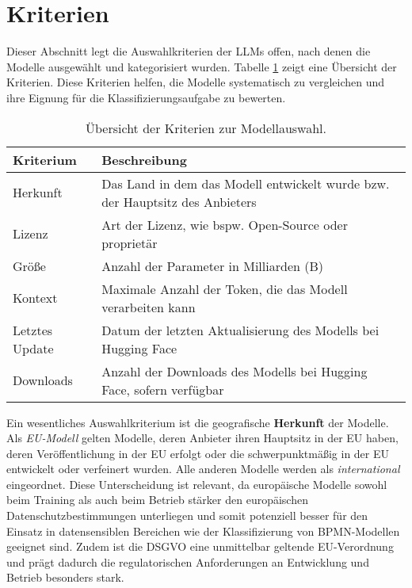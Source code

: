 \section{Kriterien}\label{sec:kriterien}

Dieser Abschnitt legt die Auswahlkriterien der \acp{LLM} offen, nach denen die Modelle ausgewählt und kategorisiert wurden. Tabelle \ref{tab:kriterien} zeigt eine Übersicht der Kriterien. Diese Kriterien helfen, die Modelle systematisch zu vergleichen und ihre Eignung für die Klassifizierungsaufgabe zu bewerten.

\begin{table}[htbp]
    \centering
    \caption{Übersicht der Kriterien zur Modellauswahl.}
    \label{tab:kriterien}
    \begin{tabularx}{\textwidth}{p{} p{}}
        \toprule
        \textbf{Kriterium} & \textbf{Beschreibung} \\
        \midrule
        Herkunft & Das Land in dem das Modell entwickelt wurde bzw. der Hauptsitz des Anbieters \\
        Lizenz & Art der Lizenz, wie bspw. Open-Source oder proprietär \\
        Größe & Anzahl der Parameter in Milliarden (B) \\
        Kontext & Maximale Anzahl der Token, die das Modell verarbeiten kann \\
        Letztes Update & Datum der letzten Aktualisierung des Modells bei Hugging Face \cite{huggingface} \\
        Downloads & Anzahl der Downloads des Modells bei Hugging Face, sofern verfügbar \\
        \bottomrule
    \end{tabularx}
\end{table}

Ein wesentliches Auswahlkriterium ist die geografische \textbf{Herkunft} der Modelle. Als \emph{\ac{EU}-Modell} gelten Modelle, deren Anbieter ihren Hauptsitz in der \ac{EU} haben, deren Veröffentlichung in der \ac{EU} erfolgt oder die schwerpunktmäßig in der \ac{EU} entwickelt oder verfeinert wurden. Alle anderen Modelle werden als \emph{international} eingeordnet. Diese Unterscheidung ist relevant, da europäische Modelle sowohl beim Training als auch beim Betrieb stärker den europäischen Datenschutzbestimmungen unterliegen und somit potenziell besser für den Einsatz in datensensiblen Bereichen wie der Klassifizierung von \ac{BPMN}-Modellen geeignet sind. Zudem ist die \ac{DSGVO} eine unmittelbar geltende \ac{EU}-Verordnung und prägt dadurch die regulatorischen Anforderungen an Entwicklung und Betrieb besonders stark.


